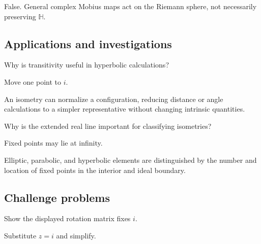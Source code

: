 \begin{solution}
False.  General complex Mobius maps act on the Riemann sphere, not necessarily preserving \(\mathbb H\).
\end{solution}

\subsection*{Applications and investigations}

\begin{exercise}[Normalization]\label{exr:vii33-ped-13}
Why is transitivity useful in hyperbolic calculations?
\end{exercise}

\begin{hint}
Move one point to \(i\).
\end{hint}

\begin{solution}
An isometry can normalize a configuration, reducing distance or angle calculations to a simpler representative without changing intrinsic quantities.
\end{solution}

\begin{exercise}\label{exr:vii33-ped-14}
Why is the extended real line important for classifying isometries?
\end{exercise}

\begin{hint}
Fixed points may lie at infinity.
\end{hint}

\begin{solution}
Elliptic, parabolic, and hyperbolic elements are distinguished by the number and location of fixed points in the interior and ideal boundary.
\end{solution}

\subsection*{Challenge problems}

\begin{exercise}\label{exr:vii33-ped-15}
Show the displayed rotation matrix fixes \(i\).
\end{exercise}

\begin{hint}
Substitute \(z=i\) and simplify.
\end{hint}

